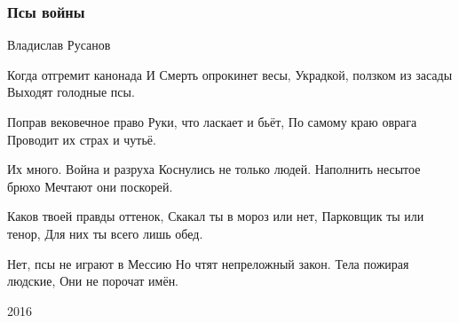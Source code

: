  
 
 

\subsubsection{Псы войны}

Владислав Русанов

Когда отгремит канонада
И Смерть опрокинет весы,
Украдкой, ползком из засады
Выходят голодные псы.

Поправ вековечное право
Руки, что ласкает и бьёт,
По самому краю оврага
Проводит их страх и чутьё.

Их много. Война и разруха
Коснулись не только людей.
Наполнить несытое брюхо
Мечтают они поскорей.

Каков твоей правды оттенок,
Скакал ты в мороз или нет,
Парковщик ты или тенор,
Для них ты всего лишь обед.

Нет, псы не играют в Мессию
Но чтят непреложный закон.
Тела пожирая людские,
Они не порочат имён.

2016
